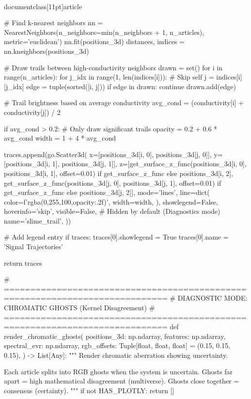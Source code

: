 \\documentclass[11pt]{article}
\begin{document}
\begin{CodeBlock}
{{    # Find k-nearest neighbors
    nn = NearestNeighbors(n_neighbors=min(n_neighbors + 1, n_articles), metric='euclidean')
    nn.fit(positions_3d)
    distances, indices = nn.kneighbors(positions_3d)

    # Draw trails between high-conductivity neighbors
    drawn = set()
    for i in range(n_articles):
        for j_idx in range(1, len(indices[i])):  # Skip self
            j = indices[i][j_idx]
            edge = tuple(sorted([i, j]))
            if edge in drawn:
                continue
            drawn.add(edge)

            # Trail brightness based on average conductivity
            avg_cond = (conductivity[i] + conductivity[j]) / 2

            if avg_cond > 0.2:  # Only draw significant trails
                opacity = 0.2 + 0.6 * avg_cond
                width = 1 + 4 * avg_cond

                traces.append(go.Scatter3d(
                    x=[positions_3d[i, 0], positions_3d[j, 0]],
                    y=[positions_3d[i, 1], positions_3d[j, 1]],
                    z=[get_surface_z_func(positions_3d[i, 0], positions_3d[i, 1], offset=0.01) if get_surface_z_func else positions_3d[i, 2],
                       get_surface_z_func(positions_3d[j, 0], positions_3d[j, 1], offset=0.01) if get_surface_z_func else positions_3d[j, 2]],
                    mode='lines',
                    line=dict(
                        color=f'rgba(0,255,100,{opacity:.2f})',
                        width=width,
                    ),
                    showlegend=False,
                    hoverinfo='skip',
                    visible=False,  # Hidden by default (Diagnostics mode)
                    name='slime_trail',
                ))

    # Add legend entry
    if traces:
        traces[0].showlegend = True
        traces[0].name = 'Signal Trajectories'

    return traces


# =============================================================================
# DIAGNOSTIC MODE: CHROMATIC GHOSTS (Kernel Disagreement)
# =============================================================================
def render_chromatic_ghosts(
    positions_3d: np.ndarray,
    features: np.ndarray,
    spectral_evr: np.ndarray,
    rgb_offsets: Tuple[float, float, float] = (0.15, 0.15, 0.15),
) -> List[Any]:
    """
    Render chromatic aberration showing uncertainty.

    Each article splits into RGB ghosts when the system is uncertain.
    Ghosts far apart = high mathematical disagreement (multiverse).
    Ghosts close together = consensus (certainty).
    """
    if not HAS_PLOTLY:
        return []

}}
\end{CodeBlock}
\end{document}
